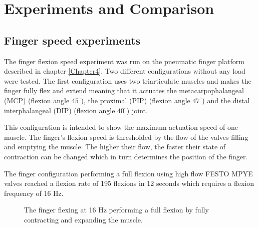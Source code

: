 \documentclass[main]{subfiles}
\begin{document}
\chapter{Experiments and Comparison} %

\label{Chapter5} %




\section{Finger speed experiments}
The finger flexion speed experiment was run on the pneumatic finger platform described in chapter \ref{Chapter4}. Two different configurations without any load were tested. The first configuration uses two triarticulate muscles and makes the finger fully flex and extend meaning that it actuates the metacarpophalangeal (MCP) (flexion angle $45^\circ$), the proximal (PIP) (flexion angle $47^\circ$) and the distal interphalangeal (DIP) (flexion angle $40^\circ$) joint.

 This configuration is intended to show the maximum actuation speed of one muscle. The finger's flexion speed is thresholded by the flow of the valves filling and emptying the muscle. The higher their flow, the faster their state of contraction can be changed which in turn determines the position of the finger. 

The finger configuration performing a full flexion using high flow FESTO MPYE valves reached a flexion rate of 195 flexions in 12 seconds which requires a flexion frequency of 16 Hz.


\begin{figure}[H]
\centering
{}\hspace{0.15\textwidth}
\caption[Full finger flexion at 16 Hz]{The finger flexing at 16 Hz performing a full flexion by fully contracting and expanding the muscle.}
\label{full-flexion}
\end{figure}
\end{document}
